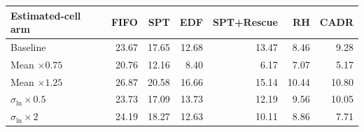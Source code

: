 \begin{tabular}{lrrrrrr}
\toprule
Estimated-cell arm & FIFO & SPT & EDF & SPT+Rescue & RH & CADR \\
\midrule
Baseline & 23.67 & 17.65 & 12.68 & 13.47 & 8.46 & 9.28 \\
Mean $\times 0.75$ & 20.76 & 12.16 & 8.40 & 6.17 & 7.07 & 5.17 \\
Mean $\times 1.25$ & 26.87 & 20.58 & 16.66 & 15.14 & 10.44 & 10.80 \\
$\sigma_{\ln}\times 0.5$ & 23.73 & 17.09 & 13.73 & 12.19 & 9.56 & 10.05 \\
$\sigma_{\ln}\times 2$ & 24.19 & 18.27 & 12.63 & 10.11 & 8.86 & 7.71 \\
\bottomrule
\end{tabular}
